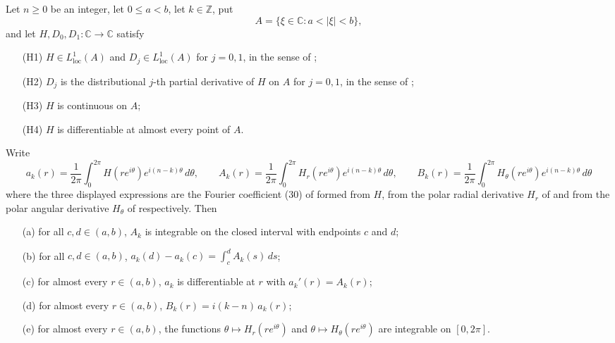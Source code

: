 \begin{lemma}
Let $n\ge0$ be an integer, let $0\le a<b$, let $k\in\mathbb{Z}$, put
\[
  A=\{\xi\in\mathbb{C}:a<|\xi|<b\},
\]
and let $H,D_0,D_1\colon\mathbb{C}\to\mathbb{C}$ satisfy
\begin{enumerate}
\item[(H1)] $H\in L^{1}_{\mathrm{loc}}(A)$ and $D_j\in L^{1}_{\mathrm{loc}}(A)$
  for $j=0,1$, in the sense of ;
\item[(H2)] $D_j$ is the distributional $j$-th partial derivative of $H$ on
  $A$ for $j=0,1$, in the sense of ;
\item[(H3)] $H$ is continuous on $A$;
\item[(H4)] $H$ is differentiable at almost every point of $A$.
\end{enumerate}
Write
\[
  a_k(r)=\frac1{2\pi}\int_0^{2\pi}H(re^{i\theta})e^{i(n-k)\theta}\,d\theta,
  \qquad
  A_k(r)=\frac1{2\pi}\int_0^{2\pi}H_r(re^{i\theta})e^{i(n-k)\theta}\,d\theta,
  \qquad
  B_k(r)=\frac1{2\pi}\int_0^{2\pi}H_\theta(re^{i\theta})e^{i(n-k)\theta}\,d\theta
\]
where the three displayed expressions are the Fourier coefficient (30) of
 formed from $H$, from the polar radial derivative
$H_r$ of  and from the polar angular derivative $H_\theta$ of
 respectively.  Then
\begin{enumerate}
\item[(a)] for all $c,d\in(a,b)$, $A_k$ is integrable on the closed interval
  with endpoints $c$ and $d$;
\item[(b)] for all $c,d\in(a,b)$,
  $a_k(d)-a_k(c)=\displaystyle\int_c^dA_k(s)\,ds$;
\item[(c)] for almost every $r\in(a,b)$, $a_k$ is differentiable at $r$ with
  $a_k'(r)=A_k(r)$;
\item[(d)] for almost every $r\in(a,b)$, $B_k(r)=i(k-n)\,a_k(r)$;
\item[(e)] for almost every $r\in(a,b)$, the functions
  $\theta\mapsto H_r(re^{i\theta})$ and $\theta\mapsto H_\theta(re^{i\theta})$
  are integrable on $[0,2\pi]$.
\end{enumerate}


\end{lemma}
